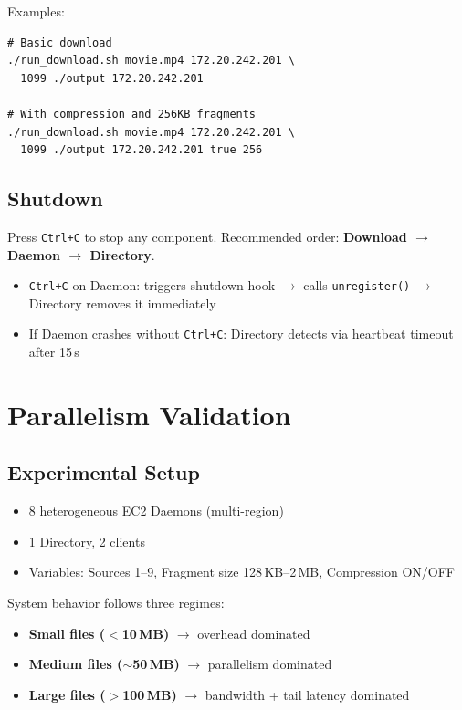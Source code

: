 \documentclass[10pt,twocolumn,a4paper]{article}
\begin{document}
Examples:
\begin{lstlisting}
# Basic download
./run_download.sh movie.mp4 172.20.242.201 \
  1099 ./output 172.20.242.201

# With compression and 256KB fragments
./run_download.sh movie.mp4 172.20.242.201 \
  1099 ./output 172.20.242.201 true 256
\end{lstlisting}

\subsection{Shutdown}
Press \texttt{Ctrl+C} to stop any component. Recommended order: \textbf{Download $\to$ Daemon $\to$ Directory}.

\begin{itemize}[nosep,leftmargin=1.5em]
  \item \texttt{Ctrl+C} on Daemon: triggers shutdown hook $\to$ calls \texttt{unregister()} $\to$ Directory removes it immediately
  \item If Daemon crashes without \texttt{Ctrl+C}: Directory detects via heartbeat timeout after 15\,s
\end{itemize}

\section{Parallelism Validation}

\subsection{Experimental Setup}

\begin{itemize}[nosep,leftmargin=1.5em]
  \item 8 heterogeneous EC2 Daemons (multi-region)
  \item 1 Directory, 2 clients
  \item Variables: Sources 1--9, Fragment size 128\,KB--2\,MB, Compression ON/OFF
\end{itemize}

System behavior follows three regimes:
\begin{itemize}[nosep,leftmargin=1.5em]
  \item \textbf{Small files ($<$10\,MB)} $\to$ overhead dominated
  \item \textbf{Medium files ($\sim$50\,MB)} $\to$ parallelism dominated
  \item \textbf{Large files ($>$100\,MB)} $\to$ bandwidth + tail latency dominated
\end{itemize}
\end{document}
